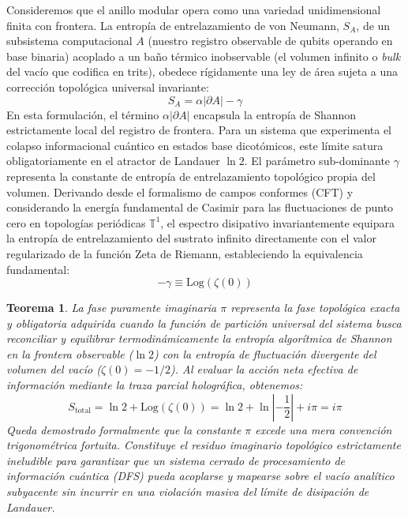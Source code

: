 \documentclass[12pt,a4paper]{article}
\theoremstyle{plain}
\newtheorem{teorema}{Teorema}[section]
\theoremstyle{definition}
\theoremstyle{remark}
\begin{document}
Consideremos que el anillo modular opera como una variedad unidimensional finita con frontera. La entropía de entrelazamiento de von Neumann, $S_A$, de un subsistema computacional $A$ (nuestro registro observable de qubits operando en base binaria) acoplado a un baño térmico inobservable (el volumen infinito o \textit{bulk} del vacío que codifica en trits), obedece rígidamente una ley de área sujeta a una corrección topológica universal invariante:
\begin{equation}
    S_A = \alpha |\partial A| - \gamma
\end{equation}
En esta formulación, el término $\alpha |\partial A|$ encapsula la entropía de Shannon estrictamente local del registro de frontera. Para un sistema que experimenta el colapso informacional cuántico en estados base dicotómicos, este límite satura obligatoriamente en el atractor de Landauer $\ln 2$. El parámetro sub-dominante $\gamma$ representa la constante de entropía de entrelazamiento topológico propia del volumen.
Derivando desde el formalismo de campos conformes (CFT) y considerando la energía fundamental de Casimir para las fluctuaciones de punto cero en topologías periódicas $\mathbb{T}^1$, el espectro disipativo invariantemente equipara la entropía de entrelazamiento del sustrato infinito directamente con el valor regularizado de la función Zeta de Riemann, estableciendo la equivalencia fundamental:
\begin{equation}
    -\gamma \equiv \text{Log}(\zeta(0))
\end{equation}

\begin{teorema}
La fase puramente imaginaria $\pi$ representa la fase topológica exacta y obligatoria adquirida cuando la función de partición universal del sistema busca reconciliar y equilibrar termodinámicamente la entropía algorítmica de Shannon en la frontera observable ($\ln 2$) con la entropía de fluctuación divergente del volumen del vacío ($\zeta(0) = -1/2$). Al evaluar la acción neta efectiva de información mediante la traza parcial holográfica, obtenemos:
\begin{equation}
    S_{\text{total}} = \ln 2 + \text{Log}(\zeta(0)) = \ln 2 + \ln\left|-\frac{1}{2}\right| + i\pi = i\pi
\end{equation}
Queda demostrado formalmente que la constante $\pi$ excede una mera convención trigonométrica fortuita. Constituye el residuo imaginario topológico estrictamente ineludible para garantizar que un sistema cerrado de procesamiento de información cuántica (DFS) pueda acoplarse y mapearse sobre el vacío analítico subyacente sin incurrir en una violación masiva del límite de disipación de Landauer.
\end{teorema}
\end{document}
